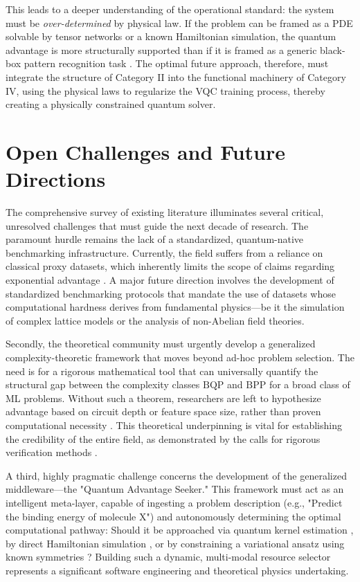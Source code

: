 \documentclass{article}
\begin{document}
This leads to a deeper understanding of the operational standard: the system must be \textit{over-determined} by physical law. If the problem can be framed as a PDE solvable by tensor networks or a known Hamiltonian simulation, the quantum advantage is more structurally supported than if it is framed as a generic black-box pattern recognition task \cite{chen2022quantum}. The optimal future approach, therefore, must integrate the structure of Category II into the functional machinery of Category IV, using the physical laws to regularize the VQC training process, thereby creating a physically constrained quantum solver.

\section{Open Challenges and Future Directions}

\label{sec:open\_challenges\_and\_future\_directions}

The comprehensive survey of existing literature illuminates several critical, unresolved challenges that must guide the next decade of research. The paramount hurdle remains the lack of a standardized, quantum-native benchmarking infrastructure. Currently, the field suffers from a reliance on classical proxy datasets, which inherently limits the scope of claims regarding exponential advantage \cite{cerezo2022challenges}. A major future direction involves the development of standardized benchmarking protocols that mandate the use of datasets whose computational hardness derives from fundamental physics---be it the simulation of complex lattice models or the analysis of non-Abelian field theories.

Secondly, the theoretical community must urgently develop a generalized complexity-theoretic framework that moves beyond ad-hoc problem selection. The need is for a rigorous mathematical tool that can universally quantify the structural gap between the complexity classes $\text{BQP}$ and $\text{BPP}$ for a broad class of ML problems. Without such a theorem, researchers are left to hypothesize advantage based on circuit depth or feature space size, rather than proven computational necessity \cite{huang2021informationtheoretic}. This theoretical underpinning is vital for establishing the credibility of the entire field, as demonstrated by the calls for rigorous verification methods \cite{liu2024verifying}.

A third, highly pragmatic challenge concerns the development of the generalized middleware---the "Quantum Advantage Seeker." This framework must act as an intelligent meta-layer, capable of ingesting a problem description (e.g., "Predict the binding energy of molecule X") and autonomously determining the optimal computational pathway: Should it be approached via quantum kernel estimation \cite{jager2023universal}, by direct Hamiltonian simulation \cite{kuhne2020electronic}, or by constraining a variational ansatz using known symmetries \cite{cuomo2022scientific}? Building such a dynamic, multi-modal resource selector represents a significant software engineering and theoretical physics undertaking.
\end{document}
